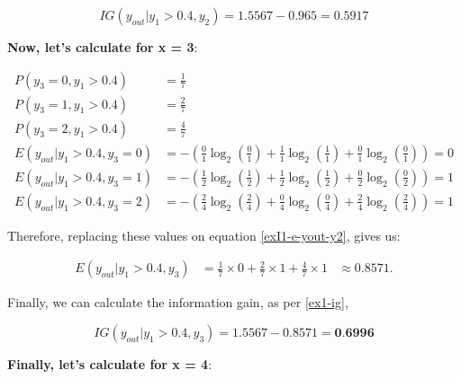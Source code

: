 \documentclass[12pt]{article}
\begin{document}
\begin{enumerate}[leftmargin=\labelsep]
        \[
          IG(y_{out} |y_1 > 0.4, y_{2}) = 1.5567 - 0.965 = 0.5917
        \]

        \textbf{Now, let's calculate for x = 3}:

        \[
          \begin{aligned}
            P(y_3 = 0, y_1 > 0.4)            & = \frac{1}{7}                                                                                     \\
            P(y_3 = 1, y_1 > 0.4)            & = \frac{2}{7}                                                                                     \\
            P(y_3 = 2, y_1 > 0.4)            & = \frac{4}{7}                                                                                     \\
            E(y_{out} | y_1 > 0.4 , y_3 = 0) & = - \left(\frac{0}{1} \log_2\left(\frac{0}{1}\right) + \frac{1}{1} \log_2\left(\frac{1}{1}\right)
            + \frac{0}{1} \log_2\left(\frac{0}{1}\right)\right) = 0                                                                              \\
            E(y_{out} | y_1 > 0.4 , y_3 = 1) & = - \left(\frac{1}{2} \log_2\left(\frac{1}{2}\right) + \frac{1}{2} \log_2\left(\frac{1}{2}\right)
            + \frac{0}{2} \log_2\left(\frac{0}{2}\right)\right) = 1                                                                              \\
            E(y_{out} | y_1 > 0.4 , y_3 = 2) & = - \left(\frac{2}{4} \log_2\left(\frac{2}{4}\right) + \frac{0}{4} \log_2\left(\frac{0}{4}\right)
            + \frac{2}{4} \log_2\left(\frac{2}{4}\right)\right) = 1
          \end{aligned}
        \]

        Therefore, replacing these values on equation \eqref{exI1-e-yout-y2}, gives us:

        \[
          \begin{aligned}
            E(y_{out} | y_1>0.4, y_3) & = \frac{1}{7} \times 0 + \frac{2}{7} \times 1 +  \frac{4}{7} \times 1 & \approx 0.8571.
          \end{aligned}
        \]

        Finally, we can calculate the information gain, as per \eqref{ex1-ig},

        \[
          IG(y_{out} | y_1 > 0.4, y_{3}) = 1.5567 - 0.8571 = \textbf{0.6996}
        \]

        \textbf{Finally, let's calculate for x = 4}:


\end{enumerate}
\end{document}
